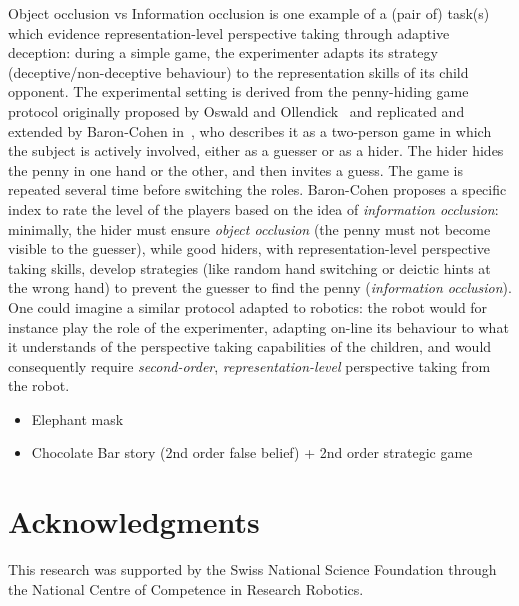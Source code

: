 \documentclass{sig-alternate}
\begin{document}
Object occlusion vs Information occlusion is one example of a (pair of) task(s)
which evidence representation-level perspective taking through adaptive
deception: during a simple game, the experimenter adapts its strategy
(deceptive/non-deceptive behaviour) to the representation skills of its child
opponent. The experimental setting is derived from the penny-hiding game
protocol originally proposed by Oswald and Ollendick~\cite{oswald1989role} and
replicated and extended by Baron-Cohen in~\cite{baron1992out}, who describes it
as a two-person game in which the subject is actively involved, either as a
guesser or as a hider. The hider hides the penny in one hand or the other, and
then invites a guess. The game is repeated several time before switching the
roles. Baron-Cohen proposes a specific index to rate the level of the players
based on the idea of \emph{information occlusion}: minimally, the hider must
ensure \emph{object occlusion} (the penny must not become visible to the
guesser), while good hiders, with representation-level perspective taking
skills, develop strategies (like random hand switching or deictic hints at the
wrong hand) to prevent the guesser to find the penny (\emph{information
occlusion}). One could imagine a similar protocol adapted to robotics:
the robot would for instance play the role of the experimenter, adapting
on-line its behaviour to what it understands of the perspective taking
capabilities of the children, and would consequently require
\emph{second-order}, \emph{representation-level} perspective taking from the
robot.

\begin{itemize}
    \item Elephant mask
    \item Chocolate Bar story (2nd order false belief) + 2nd order strategic
        game~\cite{flobbe2008children}
\end{itemize}

\section*{Acknowledgments}

This research was supported by the Swiss National Science Foundation through the
National Centre of Competence in Research Robotics.






\end{document}
